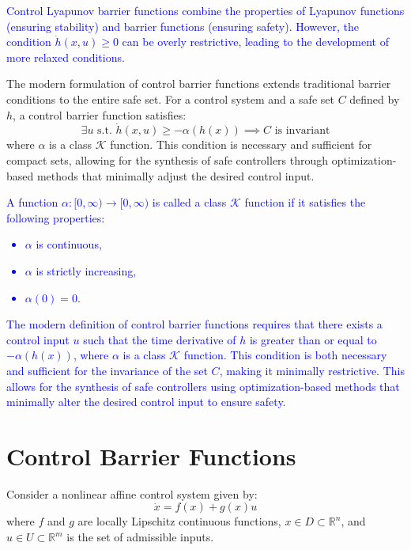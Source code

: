 \documentclass[12pt]{article}
\begin{document}
\textcolor{blue}{
Control Lyapunov barrier functions combine the properties of Lyapunov functions (ensuring stability) and barrier functions (ensuring safety). However, the condition \( \dot{h}(x, u) \geq 0 \) can be overly restrictive, leading to the development of more relaxed conditions.
}

The modern formulation of control barrier functions extends traditional barrier conditions to the entire safe set. For a control system and a safe set \( C \) defined by \( h \), a control barrier function satisfies:
\[
\exists u \text{ s.t. } \dot{h}(x, u) \geq -\alpha(h(x)) \implies C \text{ is invariant}
\]
where \( \alpha \) is a class \( \mathcal{K} \) function. This condition is necessary and sufficient for compact sets, allowing for the synthesis of safe controllers through optimization-based methods that minimally adjust the desired control input.

\textcolor{blue}{
A function \(\alpha: [0, \infty) \to [0, \infty)\) is called a class \(\mathcal{K}\) function if it satisfies the following properties:
\begin{itemize}
    \item \(\alpha\) is continuous,
    \item \(\alpha\) is strictly increasing,
    \item \(\alpha(0) = 0\).
\end{itemize}
}

\textcolor{blue}{
The modern definition of control barrier functions requires that there exists a control input \( u \) such that the time derivative of \( h \) is greater than or equal to \(-\alpha(h(x))\), where \( \alpha \) is a class \( \mathcal{K} \) function. This condition is both necessary and sufficient for the invariance of the set \( C \), making it minimally restrictive. This allows for the synthesis of safe controllers using optimization-based methods that minimally alter the desired control input to ensure safety.
}

\section{Control Barrier Functions}
Consider a nonlinear affine control system given by:
\[
\dot{x} = f(x) + g(x)u
\]
where \( f \) and \( g \) are locally Lipschitz continuous functions, \( x \in D \subset \mathbb{R}^n \), and \( u \in U \subset \mathbb{R}^m \) is the set of admissible inputs.
\end{document}
